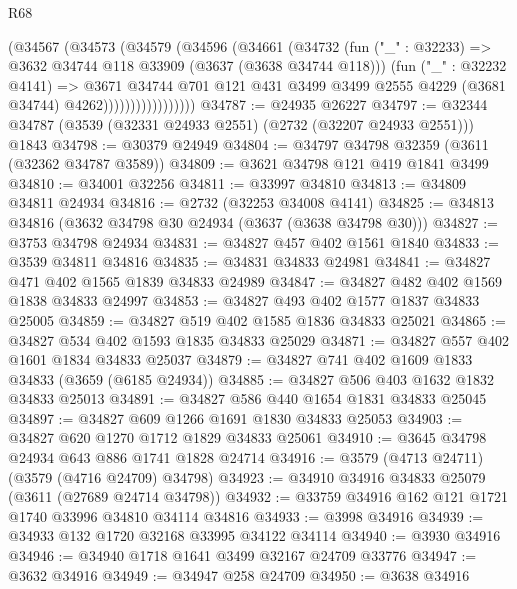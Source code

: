 \begin{lexlean}{R68}
\begin{coremodule}
                        (@34567
                          (@34573
                            (@34579
                              (@34596
                                (@34661
                                  (@34732
                                    (fun ("_" : @32233) =>
                                    @3632 @34744 @118 @33909 (@3637 (@3638 @34744 @118)))
                                    (fun ("_" : @32232 @4141) =>
                                    @3671
                                      @34744
                                      @701
                                      @121
                                      @431
                                      @3499
                                      @3499
                                      @2555
                                      @4229
                                      (@3681 @34744)
                                      @4262)))))))))))))))))
@34787 := @24935 @26227
@34797 := @32344 @34787 (@3539 (@32331 @24933 @2551) (@2732 (@32207 @24933 @2551))) @1843
@34798 := @30379 @24949
@34804 := @34797 @34798 @32359 (@3611 (@32362 @34787 @3589))
@34809 := @3621 @34798 @121 @419 @1841 @3499
@34810 := @34001 @32256
@34811 := @33997 @34810
@34813 := @34809 @34811 @24934
@34816 := @2732 (@32253 @34008 @4141)
@34825 := @34813 @34816 (@3632 @34798 @30 @24934 (@3637 (@3638 @34798 @30)))
@34827 := @3753 @34798 @24934
@34831 := @34827 @457 @402 @1561 @1840
@34833 := @3539 @34811 @34816
@34835 := @34831 @34833 @24981
@34841 := @34827 @471 @402 @1565 @1839 @34833 @24989
@34847 := @34827 @482 @402 @1569 @1838 @34833 @24997
@34853 := @34827 @493 @402 @1577 @1837 @34833 @25005
@34859 := @34827 @519 @402 @1585 @1836 @34833 @25021
@34865 := @34827 @534 @402 @1593 @1835 @34833 @25029
@34871 := @34827 @557 @402 @1601 @1834 @34833 @25037
@34879 := @34827 @741 @402 @1609 @1833 @34833 (@3659 (@6185 @24934))
@34885 := @34827 @506 @403 @1632 @1832 @34833 @25013
@34891 := @34827 @586 @440 @1654 @1831 @34833 @25045
@34897 := @34827 @609 @1266 @1691 @1830 @34833 @25053
@34903 := @34827 @620 @1270 @1712 @1829 @34833 @25061
@34910 := @3645 @34798 @24934 @643 @886 @1741 @1828 @24714
@34916 := @3579 (@4713 @24711) (@3579 (@4716 @24709) @34798)
@34923 := @34910 @34916 @34833 @25079 (@3611 (@27689 @24714 @34798))
@34932 := @33759 @34916 @162 @121 @1721 @1740 @33996 @34810 @34114 @34816
@34933 := @3998 @34916
@34939 := @34933 @132 @1720 @32168 @33995 @34122 @34114
@34940 := @3930 @34916
@34946 := @34940 @1718 @1641 @3499 @32167 @24709 @33776
@34947 := @3632 @34916
@34949 := @34947 @258 @24709
@34950 := @3638 @34916

\end{coremodule}
\end{lexlean}
